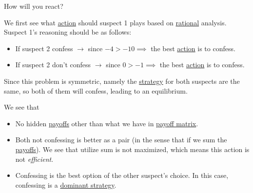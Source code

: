 \begin{eg}
\begin{itemize}
\begin{table}[H]
		      \end{table}
	\end{itemize}
	\begin{problem}
	How will you react?
	\end{problem}
	\begin{answer}
		We first see what \hyperref[def:strategy]{action} should suspect 1 plays based on \hyperref[rationality]{rational} analysis. Suspect 1's reasoning
		should be as follows:
		\begin{itemize}
			\item If suspect 2 confess \(\to \) since \(-4> -10 \implies\) the best \hyperref[def:strategy]{action} is to confess.
			\item If suspect 2 don't confess \(\to \) since \(0>-1 \implies\) the best \hyperref[def:strategy]{action} is to confess.
		\end{itemize}
		Since this problem is symmetric, namely the \hyperref[def:strategy]{strategy} for both suspects are the same, so both of them will confess, leading to an equilibrium.
	\end{answer}
	\begin{remark}
		We see that
		\begin{itemize}
			\item No hidden \hyperref[def:reward]{payoffs} other than what we have in \hyperref[def:payoff-matrix]{payoff matrix}.
			\item Both not confessing is better as a pair (in the sense that if we sum the \hyperref[def:reward]{payoffs}). We see that utilize sum is not
			      maximized, which means this action is not \emph{efficient}.
			\item Confessing is the best option of the other suspect's choice. In this case, confessing is a \hyperref[def:dominant-strategy]{dominant strategy}.
		\end{itemize}
	\end{remark}
\end{eg}

